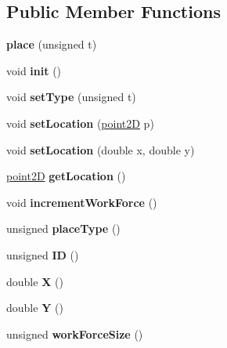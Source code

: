\subsection*{Public Member Functions}
\begin{DoxyCompactItemize}
\item 
\mbox{\label{classplace_ade1afd10cb254434214fb43d95dd6a4f}} 
{\bfseries place} (unsigned t)
\item 
\mbox{\label{classplace_a88cfb493e57ceabe0753ab98b2e6dac5}} 
void {\bfseries init} ()
\item 
\mbox{\label{classplace_a3b3fd9f79977012225fefffaf0e5f5d4}} 
void {\bfseries set\+Type} (unsigned t)
\item 
\mbox{\label{classplace_a67e4c5da30e53886486fe8ec57467ed2}} 
void {\bfseries set\+Location} (\mbox{\hyperlink{classpoint2D}{point2D}} p)
\item 
\mbox{\label{classplace_a2175356d103d8aedb4c355d7436f9d56}} 
void {\bfseries set\+Location} (double x, double y)
\item 
\mbox{\label{classplace_a41e21b063e8db8099c80f4fe13417b76}} 
\mbox{\hyperlink{classpoint2D}{point2D}} {\bfseries get\+Location} ()
\item 
\mbox{\label{classplace_acc6dddccc006b7587ac99d083f22ce4d}} 
void {\bfseries increment\+Work\+Force} ()
\item 
\mbox{\label{classplace_a327ed403446309536953b7cf9ba51fe2}} 
unsigned {\bfseries place\+Type} ()
\item 
\mbox{\label{classplace_af0d1fb750a7f800a4ae8245932a1709c}} 
unsigned {\bfseries ID} ()
\item 
\mbox{\label{classplace_ab63a396b9781a5f7d69a9f7b5ce32a1e}} 
double {\bfseries X} ()
\item 
\mbox{\label{classplace_a4104729bc9904da36159775a7cf5ce1e}} 
double {\bfseries Y} ()
\item 
\mbox{\label{classplace_a06933a289fc55df54c622725e4227003}} 
unsigned {\bfseries work\+Force\+Size} ()
\end{DoxyCompactItemize}
